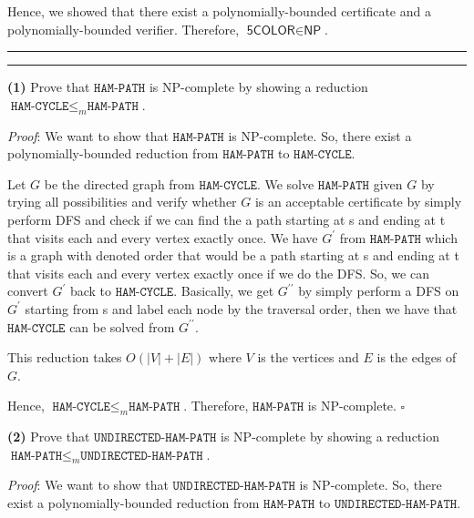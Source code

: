 \documentclass[a4paper, 11pt]{article}
\newcommand{\question}[2] {\vspace{.25in} \hrule\vspace{0.5em}
	\noindent{\bf #1: #2} \vspace{0.5em}
	\hrule \vspace{.10in}}
\renewcommand{\part}[1] {\vspace{.10in} {\bf (#1)}}
\begin{document}
	Hence, we showed that there exist a polynomially-bounded certificate and a polynomially-bounded verifier. Therefore, $\textsf{5COLOR} \in \textsf{NP}$.
		
	\question{4}{NP-Complete}
	
	\part{1} Prove that $\texttt{HAM-PATH}$ is NP-complete by showing a reduction $\texttt{HAM-CYCLE} \leq_m \texttt{HAM-PATH}$.

	{\em Proof}:  We want to show that $\texttt{HAM-PATH}$ is NP-complete. So, there exist a polynomially-bounded reduction from $\texttt{HAM-PATH}$ to $\texttt{HAM-CYCLE}$. 
	
	Let $G$ be the directed graph from $\texttt{HAM-CYCLE}$. We solve $\texttt{HAM-PATH}$ given $G$ by trying all possibilities and verify whether $G$ is an acceptable certificate by simply perform DFS and check if we can find the a path starting at s and ending at t that visits each and every vertex exactly once. We have $G^\prime$ from $\texttt{HAM-PATH}$ which is a graph with denoted order that would be a path starting at s and ending at t that visits each and every vertex exactly once if we do the DFS. So, we can convert $G^\prime$ back to $\texttt{HAM-CYCLE}$. Basically, we get $G^{\prime \prime}$ by simply perform a DFS on $G^\prime$ starting from s and label each node by the traversal order, then we have that $\texttt{HAM-CYCLE}$ can be solved from $G^{\prime \prime}$.
	
	This reduction takes $O(|V|+|E|)$ where $V$ is the vertices and $E$ is the edges of $G$.
	
	Hence, $\texttt{HAM-CYCLE} \leq_m \texttt{HAM-PATH}$. Therefore, $\texttt{HAM-PATH}$ is NP-complete. $\square$

	
	\part{2} Prove that $\texttt{UNDIRECTED-HAM-PATH}$ is NP-complete by showing a reduction $\texttt{HAM-PATH} \leq_m \texttt{UNDIRECTED-HAM-PATH}$.
	
	
	{\em Proof}: We want to show that $\texttt{UNDIRECTED-HAM-PATH}$ is NP-complete. So, there exist a polynomially-bounded reduction from $\texttt{HAM-PATH}$ to $\texttt{UNDIRECTED-HAM-PATH}$. 
	
\end{document}
